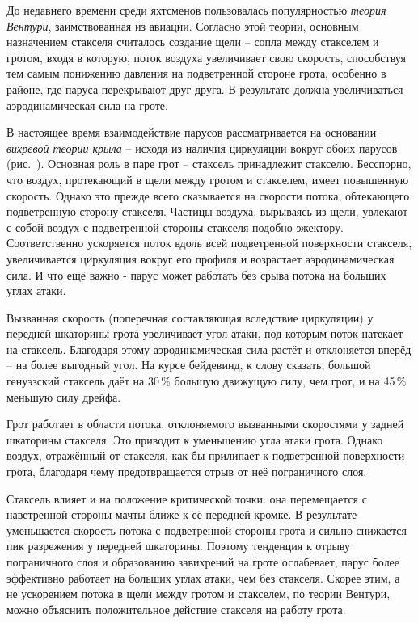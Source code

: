 До недавнего времени среди яхтсменов пользовалась популярностью \textit{теория
Вентури},
заимствованная из авиации. Согласно этой теории, основным
назначением стакселя считалось создание щели \--- сопла между
стакселем и гротом, входя в которую, поток воздуха увеличивает свою
скорость, способствуя тем самым понижению давления на подветренной
стороне грота, особенно в районе, где паруса перекрывают друг друга. В
результате должна увеличиваться аэродинамическая сила на гроте.

В настоящее время взаимодействие парусов рассматривается на основании
\textit{вихревой теории крыла} \--- исходя из
наличия циркуляции вокруг обоих парусов (рис.~). Основная роль
в паре грот \--- стаксель принадлежит стакселю. Бесспорно, что воздух,
протекающий в щели между гротом и стакселем, имеет повышенную
скорость. Однако это прежде всего сказывается на скорости потока,
обтекающего подветренную сторону стакселя. Частицы воздуха, вырываясь
из щели, увлекают с собой воздух с подветренной стороны стакселя
подобно эжектору. Соответственно ускоряется поток вдоль всей
подветренной поверхности стакселя, увеличивается циркуляция вокруг его
профиля и возрастает аэродинамическая сила. И что ещё важно - парус
может работать без срыва потока на больших углах атаки.
 
Вызванная скорость (поперечная составляющая вследствие циркуляции) у
передней шкаторины грота увеличивает угол атаки, под которым поток
натекает на стаксель. Благодаря этому аэродинамическая сила растёт и
отклоняется вперёд \--- на более выгодный угол. На курсе бейдевинд, к
слову сказать, большой генуэзский стаксель даёт на 30\,\% большую
движущую силу, чем грот, и на 45\,\% меньшую силу дрейфа.
 
Грот работает в области потока, отклоняемого вызванными скоростями у
задней шкаторины стакселя. Это приводит к уменьшению угла атаки
грота. Однако воздух, отражённый от стакселя, как бы прилипает к
подветренной поверхности грота, благодаря чему предотвращается отрыв
от неё пограничного слоя.

Стаксель влияет и на положение критической точки: она перемещается с
наветренной стороны мачты ближе к её передней кромке. В результате
уменьшается скорость потока с подветренной стороны грота и сильно
снижается пик разрежения у передней шкаторины. Поэтому тенденция к
отрыву пограничного слоя и образованию завихрений на гроте ослабевает,
парус более эффективно работает на больших углах атаки, чем без
стакселя. Скорее этим, а не ускорением потока в щели между гротом и
стакселем, по теории Вентури, можно объяснить положительное действие
стакселя на работу грота.

